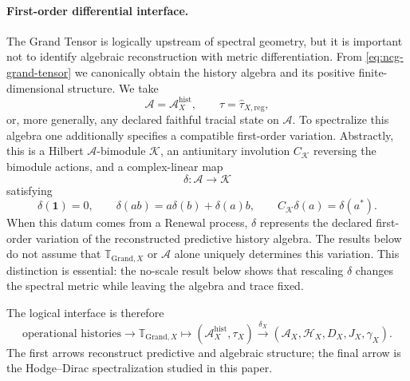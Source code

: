 \documentclass[11pt]{article}
\theoremstyle{definition}
\theoremstyle{remark}
\theoremstyle{definition}
\theoremstyle{remark}
\newcommand{\one}{\mathbf 1}
\newcommand{\A}{\mathcal A}
\newcommand{\Hh}{\mathcal H}
\newcommand{\GTX}{\boldsymbol{\mathbb T}_{\mathrm{Grand},X}}
\begin{document}
\paragraph{First-order differential interface.}

The Grand Tensor is logically upstream of spectral geometry, but it is important
not to identify algebraic reconstruction with metric differentiation.  From
\eqref{eq:ncg-grand-tensor} we canonically obtain the history algebra and its
positive finite-dimensional structure.  We take
\begin{equation}
 \A=\A_X^{\mathrm{hist}},
 \qquad
 \tau=\widehat\tau_{X,\mathrm{reg}},
\label{eq:ncg-grand-algebra-trace}
\end{equation}
or, more generally, any declared faithful tracial state on $\A$.  To spectralize
this algebra one additionally specifies a compatible first-order variation.
Abstractly, this is a Hilbert $\A$-bimodule $\mathcal K$, an antiunitary
involution $C_{\mathcal K}$ reversing the bimodule actions, and a complex-linear
map
\begin{equation}
 \delta:\A\longrightarrow\mathcal K
\label{eq:ncg-grand-delta}
\end{equation}
satisfying
\begin{equation}
 \delta(\one)=0,
 \qquad
 \delta(ab)=a\delta(b)+\delta(a)b,
 \qquad
 C_{\mathcal K}\delta(a)=\delta(a^*).
\label{eq:ncg-grand-delta-rules}
\end{equation}
When this datum comes from a Renewal process, $\delta$ represents the declared
first-order variation of the reconstructed predictive history algebra.  The
results below do not assume that $\GTX$ or $\A$ alone uniquely determines this
variation.  This distinction is essential: the no-scale result below shows that
rescaling $\delta$ changes the spectral metric while leaving the algebra and trace
fixed.

The logical interface is therefore
\begin{equation}
\boxed{
\text{operational histories}
\longrightarrow
\GTX
\longmapsto
(\A_X^{\mathrm{hist}},\tau_X)
\overset{\delta_X}{\longrightarrow}
(\A_X,\Hh_X,D_X,J_X,\gamma_X).}
\label{eq:ncg-grand-spectral-interface}
\end{equation}
The first arrows reconstruct predictive and algebraic structure; the final arrow
is the Hodge--Dirac spectralization studied in this paper.
\end{document}
